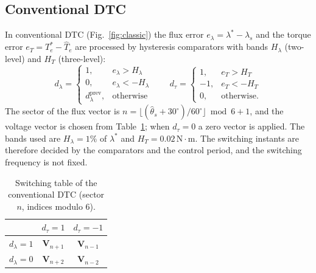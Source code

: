 \documentclass[12pt,a4paper,onecolumn]{IEEEtran}
\newcommand{\Nm}{\,\mathrm{N\cdot m}}
\begin{document}
\subsection{Conventional DTC}
In conventional DTC (Fig.~\ref{fig:classic}) the flux error $e_\lambda=\lambda^*-\hat\lambda_s$ and the torque error $e_T=T_e^*-\hat T_e$ are processed by hysteresis comparators with bands $H_\lambda$ (two-level) and $H_T$ (three-level):
\begin{equation}
d_\lambda=\begin{cases}1,& e_\lambda>H_\lambda\\ 0,& e_\lambda<-H_\lambda\\ d_\lambda^{\text{prev}},& \text{otherwise}\end{cases}\qquad
d_\tau=\begin{cases}1,& e_T>H_T\\ -1,& e_T<-H_T\\ 0,& \text{otherwise.}\end{cases} \label{eq:hyst}
\end{equation}
The sector of the flux vector is $n=\lfloor(\hat\theta_s+30^\circ)/60^\circ\rfloor \bmod 6 + 1$, and the voltage vector is chosen from Table~\ref{tab:sw}; when $d_\tau=0$ a zero vector is applied. The bands used are $H_\lambda=1\%$ of $\lambda^*$ and $H_T=0.02\Nm$. The switching instants are therefore decided by the comparators and the control period, and the switching frequency is not fixed.

\begin{table}[!t]
\centering
\caption{Switching table of the conventional DTC (sector $n$, indices modulo 6).}
\label{tab:sw}
\singlespacing
\begin{tabular}{c|cc}
\toprule
 & $d_\tau = 1$ & $d_\tau = -1$ \\
\midrule
$d_\lambda = 1$ & $\mathbf V_{n+1}$ & $\mathbf V_{n-1}$ \\
$d_\lambda = 0$ & $\mathbf V_{n+2}$ & $\mathbf V_{n-2}$ \\
\bottomrule
\end{tabular}
\end{table}
\end{document}
